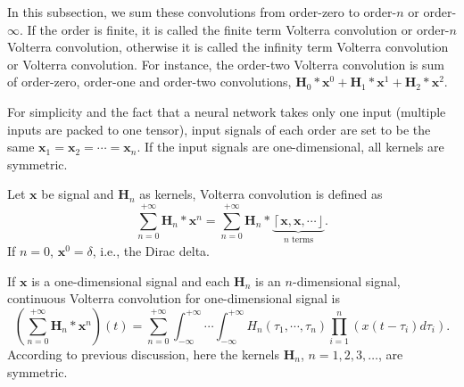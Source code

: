 \documentclass[twoside,11pt]{article}
\def\tvar#1{\mathbf{#1}} %
\def\isintinf{\int_{-\infty}^{+\infty}\!\!\!\cdots\!\int_{-\infty}^{+\infty}\!}
\def\lcerfl#1{\left\lceil{#1}\right\rfloor}
\begin{document}
In this subsection, we sum these convolutions from order-zero to order-\(n\) or order-\(\infty\).
If the order is finite, it is called the finite term Volterra convolution or order-\(n\) Volterra convolution, otherwise it is called the infinity term Volterra convolution or Volterra convolution.
For instance, the order-two Volterra convolution is sum of order-zero, order-one and order-two convolutions,
\(\tvar{H}_0 * \tvar{x}^0 + \tvar{H}_1 * \tvar{x}^1 + \tvar{H}_2 * \tvar{x}^2\).

For simplicity and the fact that a neural network takes only one input (multiple inputs are packed to one tensor), input signals of each order are set to be the same \(\tvar{x}_1 = \tvar{x}_2 = \cdots = \tvar{x}_n\). If the input signals are one-dimensional, all kernels are symmetric.


\begin{definition}
  Let \(\tvar{x}\) be signal and \(\tvar{H}_n\) as kernels, Volterra convolution \citep{volterra1932theory, rugh1981nonlinear} is defined as
  \begin{equation}
    \sum_{n=0}^{+\infty} \tvar{H}_n * \tvar{x}^n
    = \sum_{n=0}^{+\infty} \tvar{H}_n * \underbrace{\lcerfl{\tvar{x}, \tvar{x}, \cdots}}_{n \text{ terms}}.
    \label{equ:def-volterra-convolution-1d}
  \end{equation}
  If \(n=0\), \(\tvar{x}^0 = \delta\), i.e., the Dirac delta.
  \label{def:volterra-convolution-1d}
\end{definition}

If \(\tvar{x}\) is a one-dimensional signal and each \(\tvar{H}_n\) is an \(n\)-dimensional signal, continuous Volterra convolution for one-dimensional signal is
\begin{equation}
  \left( \sum_{n=0}^{+\infty} \tvar{H}_n * \tvar{x}^n  \right)(t)
  = \sum_{n=0}^{+\infty} \isintinf H_n(\tau_1, \cdots, \tau_n)
  \prod_{i=1}^{n} \left( x(t - \tau_i) d \tau_i \right).
  \label{equ:def-continuous-volterra-convolution-1d}
\end{equation}
According to previous discussion, here the kernels \(\tvar{H}_n\), $n=1,2,3,\ldots$, are symmetric.
\end{document}
